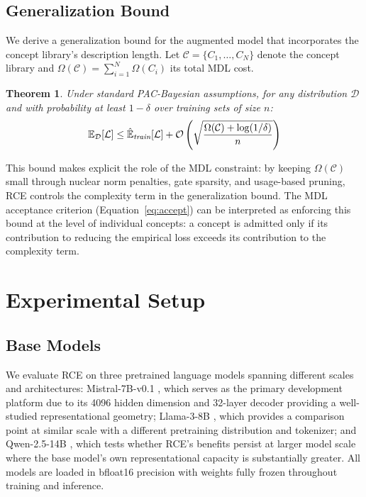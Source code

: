 \documentclass[11pt]{article}
\newtheorem{theorem}{Theorem}
\begin{document}
\subsection{Generalization Bound}

We derive a generalization bound for the augmented model that incorporates the concept library's description length. Let $\mathcal{C} = \{C_1, \ldots, C_N\}$ denote the concept library and $\Omega(\mathcal{C}) = \sum_{i=1}^N \Omega(C_i)$ its total MDL cost.

\begin{theorem}
Under standard PAC-Bayesian assumptions, for any distribution $\mathcal{D}$ and with probability at least $1 - \delta$ over training sets of size $n$:
\begin{equation}
\mathbb{E}_{\mathcal{D}}[\mathcal{L}] \leq \hat{\mathbb{E}}_{\emph{train}}[\mathcal{L}] + \mathcal{O}\left(\sqrt{\frac{\Omega(\mathcal{C}) + \log(1/\delta)}{n}}\right)
\label{eq:genbound}
\end{equation}
\end{theorem}

This bound makes explicit the role of the MDL constraint: by keeping $\Omega(\mathcal{C})$ small through nuclear norm penalties, gate sparsity, and usage-based pruning, RCE controls the complexity term in the generalization bound. The MDL acceptance criterion (Equation~\ref{eq:accept}) can be interpreted as enforcing this bound at the level of individual concepts: a concept is admitted only if its contribution to reducing the empirical loss exceeds its contribution to the complexity term.

\section{Experimental Setup}

\subsection{Base Models}

We evaluate RCE on three pretrained language models spanning different scales and architectures: Mistral-7B-v0.1 \cite{jiang2023mistral}, which serves as the primary development platform due to its 4096 hidden dimension and 32-layer decoder providing a well-studied representational geometry; Llama-3-8B \cite{touvron2023llama}, which provides a comparison point at similar scale with a different pretraining distribution and tokenizer; and Qwen-2.5-14B \cite{yang2024qwen}, which tests whether RCE's benefits persist at larger model scale where the base model's own representational capacity is substantially greater. All models are loaded in bfloat16 precision with weights fully frozen throughout training and inference.
\end{document}
